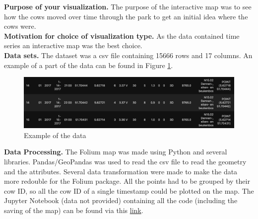 \documentclass{article}
\begin{document}
\noindent
\textbf{Purpose of your visualization.}
The purpose of the interactive map was to see how the cows moved over time through the park to get an initial idea where the cows were.
\\

\noindent
\textbf{Motivation for choice of visualization type.}
As the data contained time series an interactive map was the best choice. 
\\

\noindent
\textbf{Data sets.}
The dataset was a csv file containing 15666 rows and 17 columns.
An example of a part of the data can be found in Figure \ref{fig:csvfile}.
\\

\begin{figure}[ht]
    \centering
    \includegraphics[width=\textwidth, height=\textheight, keepaspectratio]{csv.png}
    \caption{Example of the data}
    \label{fig:csvfile}
\end{figure}



\noindent
\textbf{Data Processing.}
The Folium map was made using Python and several libraries.
Pandas/GeoPandas was used to read the csv file to read the geometry and the attributes.
Several data transformation were made to make the data more redouble for the Folium package.
All the points had to be grouped by their cow ID, so all the cow ID of a single timestamp could be plotted on the map.
The Jupyter Notebook (data not provided) containing all the code (including the saving of the map) can be found via this \href{https://github.com/RobertvdV/GRS60312_RemoteSensingAndGISIntergration_IDV_Portfolio/blob/master/notebooks/1.0-TimeStampFoliumMap.ipynb}{link}.
\\
\end{document}
